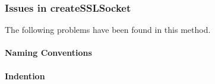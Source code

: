 
\subsubsection{Issues in createSSLSocket}
The following problems have been found in this method.

\paragraph{Naming Conventions}
\begin{itemize}
\end{itemize}

\paragraph{Indention}
\begin{itemize}
\end{itemize}


